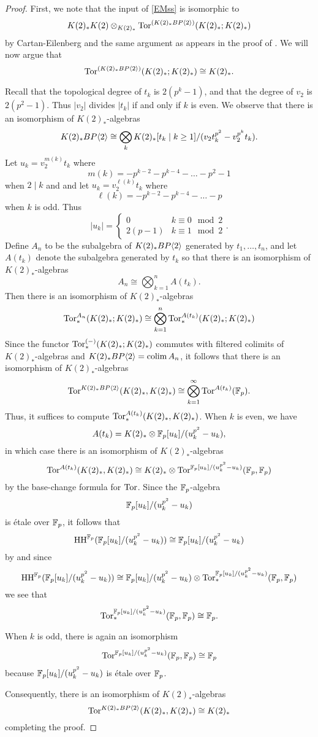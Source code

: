 \begin{proof}
First, we note that 
the input of \eqref{EMss} is isomorphic to 
\[K(2)_*K(2)\otimes_{K(2)_*}\operatorname{Tor}^{(K(2)_*BP\langle 2 \rangle)}(K(2)_*; K(2)_*)\]
by Cartan-Eilenberg \cite{qx} and the same argument as appears in the proof of \cite{qx}.
We will now argue that 
\[ \operatorname{Tor}^{(K(2)_*BP\langle 2 \rangle)}(K(2)_*; K(2)_*)\cong K(2)_*.\]

Recall that the topological degree of $t_k$ is $2(p^k-1)$, and that the degree of $v_2$ is $2(p^2-1)$. Thus $|v_2|$ divides $|t_k|$ if and only if $k$ is even. We observe that there is an isomorphism of $K(2)_*$-algebras
\[
K(2)_*BP\langle 2 \rangle \cong \bigotimes_k K(2)_*[t_k\mid k\ge 1]/(v_2t_k^{p^2}-v_2^{p^k}t_k).
\] 
Let $u_k=v_2^{m(k)}t_k$ where 
\[
m(k)=-p^{k-2}-p^{k-4} - \dots -p^2-1
\] 
when $2\mid k$ and and let $u_k=v_2^{\ell(k)}t_k$ where 
\[
\ell(k)=-p^{k-2}-p^{k-4} -\dots -p
\] 
when $k$ is odd. Thus
\[
|u_k|= 
\begin{cases}
	0 & k\equiv 0 \mod 2\\
	2(p-1) & k\equiv 1 \mod 2
\end{cases}.
\]
Define $A_n$ to be the subalgebra of $K(2)_*BP\langle 2 \rangle$ generated by $t_1, \ldots , t_n$, and let $A(t_k)$ denote the subalgebra generated by $t_k$ so that there is an isomorphism of $K(2)_*$-algebras
\[ A_n\cong \bigotimes_{k=1}^{n}A(t_k).\] 
Then there is an isomorphism of $K(2)_*$-algebras
\[
\operatorname{Tor}_*^{A_n}(K(2)_*;K(2)_*)\cong \bigotimes_{k=1}^n\operatorname{Tor}_*^{A(t_k)}(K(2)_*;K(2)_*)
\]
Since the functor $\operatorname{Tor}_*^{(-)}(K(2)_*;K(2)_*)$ commutes with filtered colimits of $K(2)_*$-algebras and $K(2)_*BP\langle 2 \rangle=\operatorname*{colim} A_n$, it follows that there is an isomorphism of $K(2)_*$-algebras
\[
\operatorname{Tor}^{K(2)_*BP\langle 2 \rangle}(K(2)_*,K(2)_*)\cong \bigotimes_{k=1}^\infty \operatorname{Tor}^{A(t_k)}(\mathbb{F}_p).
\]
Thus, it suffices to compute $\operatorname{Tor}_*^{A(t_k)}(K(2)_*,K(2)_*)$. When $k$ is even, we have 
\[
A(t_k)= K(2)_*\otimes \mathbb{F}_p[u_k]/(u_k^{p^2}-u_k),
\]
in which case there is an isomorphism of $K(2)_*$-algebras
\[
\operatorname{Tor}^{A(t_k)}(K(2)_*,K(2)_*)\cong K(2)_*\otimes \operatorname{Tor}^{\mathbb{F}_p[u_k]/(u_k^{p^2}-u_k)}(\mathbb{F}_p,\mathbb{F}_p)
\]
by the base-change formula for $\operatorname{Tor}$. 
Since the $\mathbb{F}_p$-algebra
\[
\mathbb{F}_p[u_k]/(u_k^{p^2}-u_k)
\]
is \'etale over $\mathbb{F}_p$, it follows that 
\[
\operatorname{HH}^{\mathbb{F}_p}(\mathbb{F}_p[u_k]/(u_k^{p^2}-u_k))\cong \mathbb{F}_p[u_k]/(u_k^{p^2}-u_k)
\]
by \cite{qx} and since 
\[ \operatorname{HH}^{\mathbb{F}_p}(\mathbb{F}_p[u_k]/(u_k^{p^2}-u_k))\cong \mathbb{F}_p[u_k]/(u_k^{p^2}-u_k)\otimes \operatorname{Tor}_*^{\mathbb{F}_p[u_k]/(u_k^{p^2}-u_k)}(\mathbb{F}_p,\mathbb{F}_p)\]
we see that 
\[\operatorname{Tor}_*^{\mathbb{F}_p[u_k]/(u_k^{p^2}-u_k)}(\mathbb{F}_p,\mathbb{F}_p)\cong \mathbb{F}_p.\]

When $k$ is odd,  there is again an isomorphism
\[ \operatorname{Tor}^{\mathbb{F}_p[u_k]/(u_k^{p^2}-u_k)}(\mathbb{F}_p, \mathbb{F}_p)\cong \mathbb{F}_p\] because 
$\mathbb{F}_p[u_k]/(u_k^{p^2}-u_k)$ is \'etale over $\mathbb{F}_p$.

Consequently, there is an isomorphism of $K(2)_*$-algebras
\[ \operatorname{Tor}^{K(2)_*BP\langle 2 \rangle}(K(2)_*,K(2)_*)\cong K(2)_* \]
completing the proof.
\end{proof}
